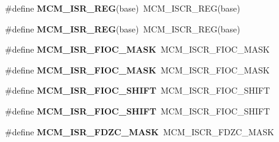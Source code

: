 \begin{DoxyCompactItemize}
\item 
\#define {\bfseries M\+C\+M\+\_\+\+I\+S\+R\+\_\+\+R\+EG}(base)~M\+C\+M\+\_\+\+I\+S\+C\+R\+\_\+\+R\+EG(base)\hypertarget{group__Backward__Compatibility__Symbols_ga699446d7e3330f72de4d6693957b3af7}{}\label{group__Backward__Compatibility__Symbols_ga699446d7e3330f72de4d6693957b3af7}

\item 
\#define {\bfseries M\+C\+M\+\_\+\+I\+S\+R\+\_\+\+R\+EG}(base)~M\+C\+M\+\_\+\+I\+S\+C\+R\+\_\+\+R\+EG(base)\hypertarget{group__Backward__Compatibility__Symbols_ga699446d7e3330f72de4d6693957b3af7}{}\label{group__Backward__Compatibility__Symbols_ga699446d7e3330f72de4d6693957b3af7}

\item 
\#define {\bfseries M\+C\+M\+\_\+\+I\+S\+R\+\_\+\+F\+I\+O\+C\+\_\+\+M\+A\+SK}~M\+C\+M\+\_\+\+I\+S\+C\+R\+\_\+\+F\+I\+O\+C\+\_\+\+M\+A\+SK\hypertarget{group__Backward__Compatibility__Symbols_gaf176751c17ea219168f69770c597d0cd}{}\label{group__Backward__Compatibility__Symbols_gaf176751c17ea219168f69770c597d0cd}

\item 
\#define {\bfseries M\+C\+M\+\_\+\+I\+S\+R\+\_\+\+F\+I\+O\+C\+\_\+\+M\+A\+SK}~M\+C\+M\+\_\+\+I\+S\+C\+R\+\_\+\+F\+I\+O\+C\+\_\+\+M\+A\+SK\hypertarget{group__Backward__Compatibility__Symbols_gaf176751c17ea219168f69770c597d0cd}{}\label{group__Backward__Compatibility__Symbols_gaf176751c17ea219168f69770c597d0cd}

\item 
\#define {\bfseries M\+C\+M\+\_\+\+I\+S\+R\+\_\+\+F\+I\+O\+C\+\_\+\+S\+H\+I\+FT}~M\+C\+M\+\_\+\+I\+S\+C\+R\+\_\+\+F\+I\+O\+C\+\_\+\+S\+H\+I\+FT\hypertarget{group__Backward__Compatibility__Symbols_gaa386b726e138197bc98ef9d8b6de5fec}{}\label{group__Backward__Compatibility__Symbols_gaa386b726e138197bc98ef9d8b6de5fec}

\item 
\#define {\bfseries M\+C\+M\+\_\+\+I\+S\+R\+\_\+\+F\+I\+O\+C\+\_\+\+S\+H\+I\+FT}~M\+C\+M\+\_\+\+I\+S\+C\+R\+\_\+\+F\+I\+O\+C\+\_\+\+S\+H\+I\+FT\hypertarget{group__Backward__Compatibility__Symbols_gaa386b726e138197bc98ef9d8b6de5fec}{}\label{group__Backward__Compatibility__Symbols_gaa386b726e138197bc98ef9d8b6de5fec}

\item 
\#define {\bfseries M\+C\+M\+\_\+\+I\+S\+R\+\_\+\+F\+D\+Z\+C\+\_\+\+M\+A\+SK}~M\+C\+M\+\_\+\+I\+S\+C\+R\+\_\+\+F\+D\+Z\+C\+\_\+\+M\+A\+SK\hypertarget{group__Backward__Compatibility__Symbols_ga610f581ddc6b9cc1e4b4847a99509a08}{}\label{group__Backward__Compatibility__Symbols_ga610f581ddc6b9cc1e4b4847a99509a08}


\end{DoxyCompactItemize}
